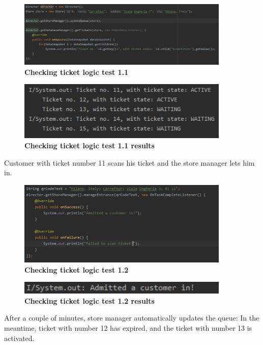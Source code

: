 \begin{itemize}
\begin{figure}[H]
\centering
\includegraphics[width=0.9\textwidth]{Images/TestingPics/Test11}
\caption{\label{fig:test17}\textbf{Checking ticket logic test 1.1}}
\end{figure}
\begin{figure}[H]
\centering
\includegraphics[width=0.9\textwidth]{Images/TestingPics/Test12}
\caption{\label{fig:test18}\textbf{Checking ticket logic test 1.1 results}}
\end{figure}

Customer with ticket number 11 scans his ticket and the store manager lets him in.

\begin{figure}[H]
\centering
\includegraphics[width=0.9\textwidth]{Images/TestingPics/Test13}
\caption{\label{fig:test19}\textbf{Checking ticket logic test 1.2}}
\end{figure}
\begin{figure}[H]
\centering
\includegraphics[width=0.9\textwidth]{Images/TestingPics/Test14}
\caption{\label{fig:test20}\textbf{Checking ticket logic test 1.2 results}}
\end{figure}
After a couple of minutes, store manager automatically updates the queue:\newline
In the meantime, ticket with number 12 has expired, and the ticket with number 13 is activated.


\end{itemize}

